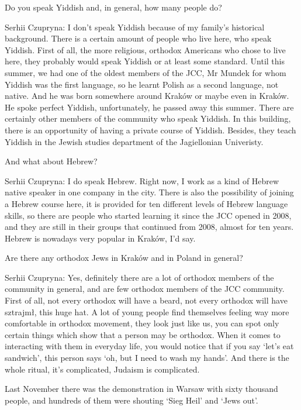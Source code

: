 Do you speak Yiddish and, in general, how many people do?  

Serhii Czupryna: I don’t speak Yiddish because of my family’s historical background. There is a certain amount of people who live here, who speak Yiddish. First of all, the more religious, orthodox Americans who chose to live here, they probably would speak Yiddish or at least some standard. Until this summer, we had one of the oldest members of the JCC, Mr Mundek for whom Yiddish was the first language, so he learnt Polish as a second language, not native. And he was born somewhere around Kraków or maybe even in Kraków. He spoke perfect Yiddish, unfortunately, he passed away this summer. There are certainly other members of the community who speak Yiddish. In this building, there is an opportunity of having a private course of Yiddish. Besides, they teach Yiddish in the Jewish studies department of the Jagiellonian Univeristy.  

And what about Hebrew? 

Serhii Czupryna: I do speak Hebrew. Right now, I work as a kind of Hebrew native speaker in one company in the city. There is also the possibility of joining a Hebrew course here, it is provided for ten different levels of Hebrew language skills, so there are people who started learning it since the JCC opened in 2008, and they are still in their groups that continued from 2008, almost for ten years. Hebrew is nowadays very popular in Kraków, I’d say.   

Are there any orthodox Jews in Kraków and in Poland in general? 

Serhii Czupryna: Yes, definitely there are a lot of orthodox members of the community in general, and are few orthodox members of the JCC community. First of all, not every orthodox will have a beard, not every orthodox will have sztrajmł, this huge hat. A lot of young people find themselves feeling way more comfortable in orthodox movement, they look just like us, you can spot only certain things which show that a person may be orthodox. When it comes to interacting with them in everyday life, you would notice that if you say ‘let’s eat sandwich’, this person says ‘oh, but I need to wash my hands’. And there is the whole ritual, it’s complicated, Judaism is complicated.  

Last November there was the demonstration in Warsaw with sixty thousand people, and hundreds of them were shouting ‘Sieg Heil’ and ‘Jews out’. 

